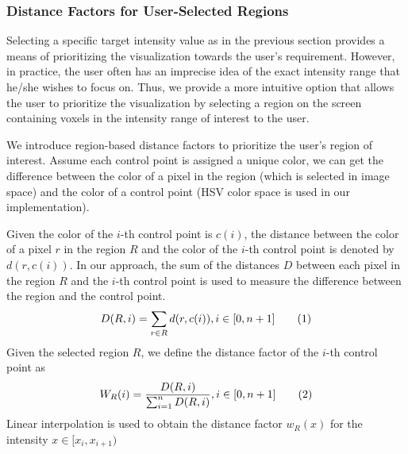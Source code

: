 
\subsubsection{Distance Factors for User-Selected Regions}


Selecting a specific target intensity value as in the previous section provides a means of prioritizing the visualization towards the user's requirement. However, in practice, the user often has an imprecise idea of the exact intensity range that he/she wishes to focus on. Thus, we provide a more intuitive option that allows the user to prioritize the visualization by selecting a region on the screen containing voxels in the intensity range of interest to the user.

We introduce region-based distance factors to prioritize the user's region of interest.
Assume each control point is assigned a unique color, we can get the difference between the color of a pixel in the region (which is selected in image space) and the color of a control point (HSV color space is used in our implementation).

Given the color of the $ i $-th control point is $ c(i) $, the distance between the color of a pixel $ r $ in the region $ R $ and the color of the $ i $-th control point is denoted by $ d(r,c(i)) $. In our approach, the sum of the distances $ D $ between each pixel in the region $ R $ and the $ i $-th control point is used to measure the difference between the region and the control point.
\[ D(R,i)=\sum_{r \in R}d(r,c(i)) , i \in [0,n+1] 
\addtag \]
Given the selected region $ R $, we define the distance factor of the $ i $-th control point as 
\[ W_{R}(i)=\frac{D(R,i)}{\sum_{i=1}^{n}D(R,i)}, i \in [0,n+1] 
\addtag \]
Linear interpolation is used to obtain the distance factor $ w_{R}(x) $ for the intensity $ x \in [x_{i},x_{i+1}) $

